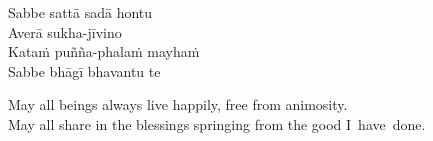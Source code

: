 \enlargethispage{\baselineskip}


\begin{paritta}
Sabbe sattā sadā hontu\\
Averā sukha-jīvino\\
Kataṁ puñña-phalaṁ mayhaṁ\\
Sabbe bhāgī bhavantu te
\end{paritta}

\begin{english}
  May all beings always live happily, free from animosity.\\
  May all share in the blessings springing from the good I~have~done.
\end{english}

